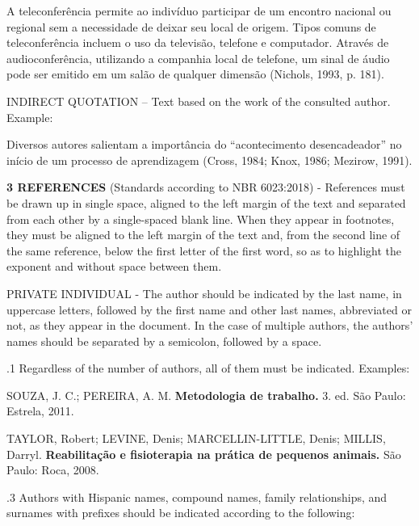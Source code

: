 \documentclass[revista,english,oneside]{ifes8}
\begin{document}
\begin{list}{}{\leftmargin=2cm\rightmargin=0pt}
\item[]\sffamily\fontsize{10}{12}\selectfont
A teleconferência permite ao indivíduo participar de um encontro nacional ou regional
sem a necessidade de deixar seu local de origem. Tipos comuns de teleconferência incluem
o uso da televisão, telefone e computador. Através de audioconferência, utilizando a
companhia local de telefone, um sinal de áudio pode ser emitido em um salão de qualquer
dimensão (Nichols, 1993, p. 181).
\end{list}

\vspace{2mm}
 INDIRECT QUOTATION -- Text based on the work of the consulted author.
Example:

Diversos autores salientam a importância do ``acontecimento desencadeador'' no início de
um processo de aprendizagem (Cross, 1984; Knox, 1986; Mezirow, 1991).

\vspace{4mm}
\noindent\textbf{3 REFERENCES} (Standards according to NBR 6023:2018) - References must
be drawn up in single space, aligned to the left margin of the text and separated from
each other by a single-spaced blank line. When they appear in footnotes, they must be
aligned to the left margin of the text and, from the second line of the same reference,
below the first letter of the first word, so as to highlight the exponent and without
space between them.

\vspace{2mm}
 PRIVATE INDIVIDUAL - The author should be indicated by the last name, in
uppercase letters, followed by the first name and other last names, abbreviated or not,
as they appear in the document. In the case of multiple authors, the authors' names
should be separated by a semicolon, followed by a space.

\vspace{2mm}
.1 Regardless of the number of authors, all of them must be indicated.
Examples:

SOUZA, J. C.; PEREIRA, A. M. \textbf{Metodologia de trabalho.} 3. ed. São Paulo:
Estrela, 2011.

TAYLOR, Robert; LEVINE, Denis; MARCELLIN-LITTLE, Denis; MILLIS, Darryl.
\textbf{Reabilitação e fisioterapia na prática de pequenos animais.} São Paulo: Roca,
2008.

\vspace{2mm}
.3 Authors with Hispanic names, compound names, family relationships, and
surnames with prefixes should be indicated according to the following:
\end{document}
